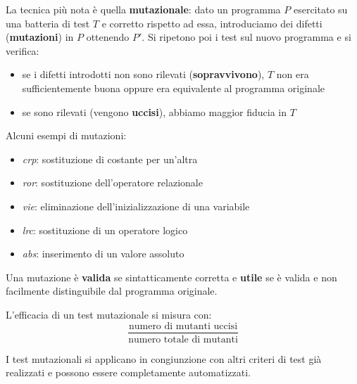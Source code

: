 La tecnica più nota è quella \textbf{mutazionale}: dato un programma $P$ esercitato su una batteria di test $T$ e corretto rispetto ad essa, introduciamo dei difetti (\textbf{mutazioni}) in $P$ ottenendo $P'$. Si ripetono poi i test sul nuovo programma e si verifica:
\begin{itemize}
	\item se i difetti introdotti non sono rilevati (\textbf{sopravvivono}), $T$ non era sufficientemente buona oppure era equivalente al programma originale
	\item se sono rilevati (vengono \textbf{uccisi}), abbiamo maggior fiducia in $T$
\end{itemize}
Alcuni esempi di mutazioni:
\begin{itemize}
	\item \textit{crp}: sostituzione di costante per un'altra
	\item \textit{ror}: sostituzione dell'operatore relazionale
	\item \textit{vie}: eliminazione dell'inizializzazione di una variabile
	\item \textit{lrc}: sostituzione di un operatore logico
	\item \textit{abs}: inserimento di un valore assoluto
\end{itemize}
\begin{note}
	Una mutazione è \textbf{valida} se sintatticamente corretta e \textbf{utile} se è valida e non facilmente distinguibile dal programma originale.
\end{note}
L'efficacia di un test mutazionale si misura con:
\begin{equation*}
	\frac{\text{numero di mutanti uccisi}}{\text{numero totale di mutanti}}
\end{equation*}

\begin{observation}
	I test mutazionali si applicano in congiunzione con altri criteri di test già realizzati e possono essere completamente automatizzati.
\end{observation}

